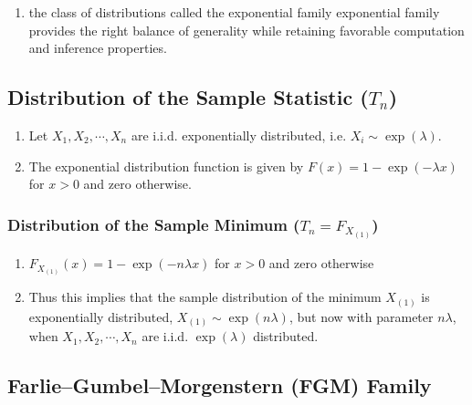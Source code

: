 \vspace{0.3cm}

\begin{enumerate}
    \item the class of distributions called the exponential family exponential family provides the right balance of generality while retaining favorable computation and inference properties.
    \hfill \cite{mfml/book/mml/Deisenroth-Faisal-Ong}
\end{enumerate}


\subsection{Distribution of the Sample Statistic ($T_n$)}

\begin{enumerate}
    \item Let $X_1 , X_2, \cdots , X _n$ are i.i.d. exponentially distributed, i.e. $X _i \sim \exp(\lambda )$.
    \hfill \cite{statistics/book/Statistics-for-Data-Scientists/Maurits-Kaptein}

    \item The exponential distribution function is given by $F (x) = 1 - \exp (-\lambda x)$ for $x > 0$ and zero otherwise.
    \hfill \cite{statistics/book/Statistics-for-Data-Scientists/Maurits-Kaptein}
\end{enumerate}

\subsubsection{Distribution of the Sample Minimum ($T_n = F _{X_{(1)}}$)}

\begin{enumerate}
    \item $F _{X_{(1)}} (x) = 1 - \exp (-n\lambda x)$ for $x > 0$ and zero otherwise
    \hfill \cite{statistics/book/Statistics-for-Data-Scientists/Maurits-Kaptein}

    \item Thus this implies that the sample distribution of the minimum $X_{(1)}$ is exponentially distributed, $X_{(1)} \sim \exp (n\lambda)$, but now with parameter $n\lambda$, when $X_1 ,X_2, \cdots , X _n$ are i.i.d. $\exp(\lambda)$ distributed.
    \hfill \cite{statistics/book/Statistics-for-Data-Scientists/Maurits-Kaptein}
\end{enumerate}



\subsection{Farlie–Gumbel–Morgenstern (FGM) Family}

